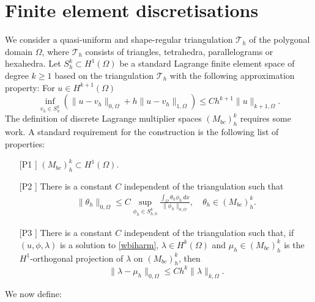 \documentclass[a4paper,final]{siamltex}
\newcommand{\CT}{\mathcal{T}}
\newcommand{\Mb}{{(M_{bc})}}
\begin{document}
\section{Finite element discretisations}\label{sec:ana}
We consider a quasi-uniform and shape-regular triangulation $\CT_h$ of the 
polygonal domain $\Omega$, where $\CT_h$
consists of triangles, tetrahedra, parallelograms or hexahedra.
Let $S^k_h \subset H^1(\Omega)$ be a standard Lagrange finite element 
space of degree $k\geq 1$ based on the triangulation $\CT_h$ 
with the following approximation property: For $u \in H^{k+1}(\Omega)$
\begin{equation}\label{approx0}
\inf_{v_h \in S^k_h} \left(\|u-v_h\|_{0,\Omega} +h \|u-v_h\|_{1,\Omega} \right)\leq C h^{k+1} \|u\|_{k+1,\Omega}.
\end{equation}
The definition of discrete Lagrange multiplier spaces $\Mb^k_h$ requires some work.
A standard requirement for the construction is the following list of properties:
\begin{enumerate}
\item[[P1\!\!]] $\Mb^k_h \subset H^1(\Omega)$.
\item[[P2\!\!]]  There is a constant $C$ independent of the triangulation such 
that 
\begin{eqnarray*}
\|\theta_h\|_{0,\Omega} \leq C \sup_{\phi_h \in S^k_{h,0}} 
\frac{ \displaystyle\int_{\Omega} \theta_h\phi_h\,dx} {\|\phi_h\|_{0,\Omega}},
\quad \theta_h \in \Mb^k_{h}.
\end{eqnarray*}
\item[[P3\!\!]] There is a constant $C$ independent of the triangulation
such that, if $(u,\phi,\lambda)$ is a solution to \eqref{wbiharm},
$\lambda\in H^k(\Omega)$ and $\mu_h\in \Mb^k_h$ is the
$H^1$-orthogonal projection of $\lambda$ on $\Mb^k_h$, then
\begin{equation}\label{approx1}
\|\lambda-\mu_h\|_{0,\Omega} \leq C h^k \|\lambda\|_{k,\Omega}.
\end{equation}
\end{enumerate}
We now define:
\end{document}
